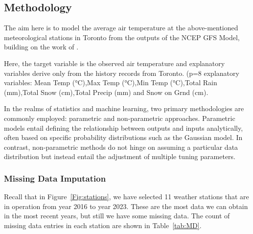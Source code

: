 \documentclass[12pt]{article}
\begin{document}
\subsection{Methodology}

The aim here is to model the average air temperature at the above-mentioned meteorological stations in Toronto from the outputs of the NCEP GFS Model, building on the work of \cite{Goutham2021}.

Here, the target variable is the observed air temperature and explanatory variables derive only from the history records from Toronto. (p=8 explanatory variables: Mean Temp (°C),Max Temp (°C),Min Temp (°C),Total Rain (mm),Total Snow (cm),Total Precip (mm) and Snow on Grnd (cm).

In the realms of statistics and machine learning, two primary methodologies are commonly employed: parametric and non-parametric approaches. Parametric models entail defining the relationship between outputs and inputs analytically, often based on specific probability distributions such as the Gaussian model. In contrast, non-parametric methods do not hinge on assuming a particular data distribution but instead entail the adjustment of multiple tuning parameters.

\subsubsection{Missing Data Imputation}

Recall that in Figure~\ref{Fig:stations}, we have selected 11 weather stations that are in operation from year 2016 to year 2023. These are the most data we can obtain in the most recent years, but still we have some missing data. The count of missing data entries in each station are shown in Table~\ref{tab:MD}.

\begin{table}[htpb]
	\centering
	\caption{Missing data counts for each weather stations}
	\label{tab:MD}
\end{table}
\end{document}
